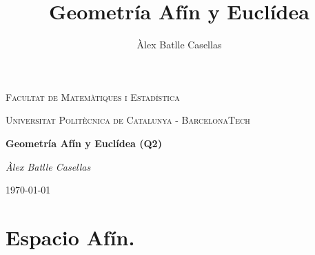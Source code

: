 \documentclass[11pt]{article}
\title{Geometría Afín y Euclídea}
\author{Àlex Batlle Casellas}
\begin{document}
\begin{titlepage}
	\centering
	{\scshape\LARGE Facultat de Matemàtiques i Estadística \par}
	\vspace{1cm}
	{\scshape\Large Universitat Politècnica de Catalunya - BarcelonaTech\par}
	\vspace{1.5cm}
	{\huge\bfseries Geometría Afín y Euclídea (Q2)
	\par}
	\vspace{2cm}
	{\Large\itshape Àlex Batlle Casellas\par}

	\vfill

	{\large \today\par}
\end{titlepage}


\vfill
\newpage\tableofcontents
\newpage
\section{Espacio Afín.}
\end{document}
